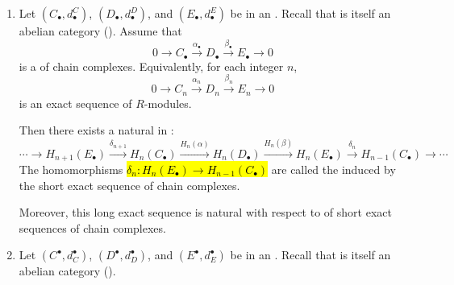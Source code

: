 \begin{theorem} \label{theorem:long_exact_sequence_in_homology_cohomology_of_a_short_exact_sequence_of_chain_complexes_in_an_abelian_category}

\begin{enumerate}
    \item 
    Let $(C_\bullet, d^C_\bullet)$, $(D_\bullet, d^D_\bullet)$, and $(E_\bullet, d^E_\bullet)$ be  in an . Recall that  is itself an abelian category ().
    Assume that 
    \[ 0 \longrightarrow C_\bullet \xrightarrow{\alpha_\bullet} D_\bullet \xrightarrow{\beta_\bullet} E_\bullet \longrightarrow 0 \]
    is a  of chain complexes. Equivalently, for each integer $n$, 
    \[ 0 \to C_n \xrightarrow{\alpha_n} D_n \xrightarrow{\beta_n} E_n \to 0 \]
    is an exact sequence of $R$-modules.

    Then there exists a natural  in :
    \[
    \cdots \longrightarrow H_{n+1}(E_\bullet) \xrightarrow{\delta_{n+1}} H_n(C_\bullet)
    \xrightarrow{H_n(\alpha)} H_n(D_\bullet)
    \xrightarrow{H_n(\beta)} H_n(E_\bullet)
    \xrightarrow{\delta_n} H_{n-1}(C_\bullet)
    \longrightarrow \cdots
    \]
    The homomorphisms \hl{$\delta_n: H_n(E_\bullet) \to H_{n-1}(C_\bullet)$} are called the  induced by the short exact sequence of chain complexes.

    Moreover, this long exact sequence is natural with respect to  of short exact sequences of chain complexes.

    \item Let $(C^\bullet, d_C^\bullet)$, $(D^\bullet, d_D^\bullet)$, and $(E^\bullet, d_E^\bullet)$ be 
    in an . 
    Recall that  
    is itself an abelian category 
    ().


\end{enumerate}
\end{theorem}
